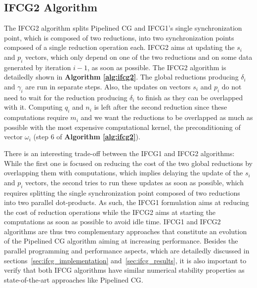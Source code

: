 \subsection{IFCG2 Algorithm}
\label{sec:ifcg2}

The IFCG2 algorithm splits Pipelined CG and IFCG1's single synchronization point, which is composed of two reductions, into two synchronization points composed of a single reduction operation each.
IFCG2 aims at updating the $s_i$ and $p_i$ vectors, which only depend on one of the two reductions and on some data generated by iteration $i-1$, as soon as possible.
The IFCG2 algorithm is detailedly shown in \textbf{Algorithm \ref{alg:ifcg2}}.
The global reductions producing $\delta_i$ and $\gamma_i$ are run in separate steps.
Also, the updates on vectors $s_i$ and $p_i$ do not need to wait for the reduction producing $\delta_i$ to finish as they can be overlapped with it.
Computing $q_i$ and $n_i$ is left after the second reduction since these computations require $m_i$ and we want the reductions to be overlapped as much as possible with the most expensive computational kernel, the preconditioning of vector $\omega_i$ (step 6 of \textbf{Algorithm \ref{alg:ifcg2}}).

There is an interesting trade-off between the IFCG1 and IFCG2 algorithms: While the first one is focused on reducing the cost of the two global reductions by overlapping them with computations, which implies delaying the update of the $s_i$ and $p_i$ vectors, the second tries to run these updates as soon as possible, which requires splitting the single synchronization point composed of two reductions into two parallel dot-products.  
As such, the IFCG1 formulation aims at reducing the cost of reduction operations while the IFCG2 aims at starting the computations as soon as possible to avoid idle time. 
IFCG1 and IFCG2 algorithms are thus two complementary approaches that constitute an evolution of the Pipelined CG algorithm aiming at increasing performance.
Besides the parallel programming and performance aspects, which are detailedly 
discussed in sections~\ref{sec:ifcg_implementation} and~\ref{sec:ifcg_results}, it is also important to verify that both IFCG algorithms have similar numerical stability properties as state-of-the-art approaches like Pipelined CG.
